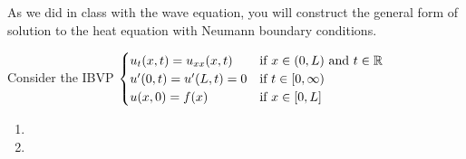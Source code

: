 As we did in class with the wave equation, you will construct the general form of solution
to the heat equation with Neumann boundary conditions.

Consider the IBVP $
\begin{cases}
    u_t(x,t) = u_{xx}(x,t) & \text{if } x \in (0, L) \text{ and } t \in \mathbb{R}\\
    u'(0,t) = u'(L,t) = 0 & \text{if } t \in [0,\infty)\\
    u(x, 0) = f(x)& \text{if } x \in [0,L]
\end{cases} $

\begin{enumerate}
\item \vspace{.5in}
\item 
\end{enumerate}
